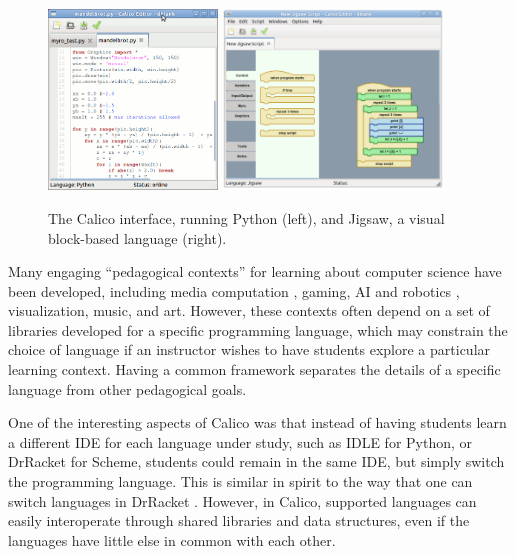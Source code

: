 \documentclass[acmsmall,screen,nonacm]{acmart}
\begin{document}
\begin{figure}[h]
  \centering
  \includegraphics[width=0.40\textwidth]{calico-interface-python.jpg}
  \hspace{0.15in}
  \includegraphics[width=0.523\textwidth]{calico-interface-jigsaw.jpg}
  \caption{The Calico interface, running Python (left),
    and Jigsaw, a visual block-based language (right).}
  \label{fig:calico}
\end{figure}


Many engaging ``pedagogical contexts'' for learning about
computer science have been developed, including media computation
\cite{Guzdial03}, gaming, AI and robotics \cite{Myro}, visualization, music,
and art.  However, these contexts often depend on a set of libraries developed
for a specific programming language, which may constrain the choice of language
if an instructor wishes to have students explore a particular learning
context. Having a common framework separates the details of a specific language
from other pedagogical goals.

One of the interesting aspects of Calico was that instead of having
students learn a different IDE for each language under study, such as
IDLE for Python, or DrRacket for Scheme, students could remain in the
same IDE, but simply switch the programming language. This is similar
in spirit to the way that one can switch languages in DrRacket \cite{Racket}.
However, in Calico, supported languages can easily interoperate through shared
libraries and data structures, even if the languages have little else in common
with each other.
\end{document}

